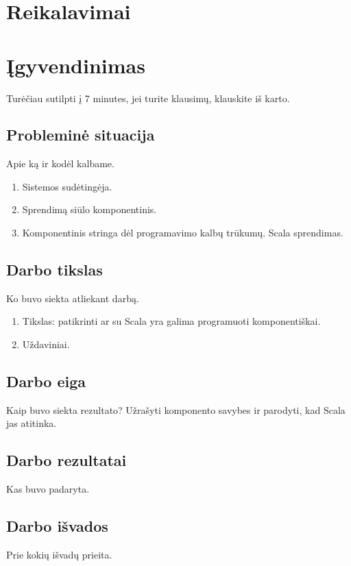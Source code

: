 \section{Reikalavimai}

\section{Įgyvendinimas}

Turėčiau sutilpti į 7 minutes, jei turite klausimų, klauskite iš karto.

\subsection{Probleminė situacija}

Apie ką ir kodėl kalbame.

\begin{enumerate}
  \item Sistemos sudėtingėja.
  \item Sprendimą siūlo komponentinis.
  \item Komponentinis stringa dėl programavimo kalbų trūkumų. Scala
    sprendimas.
\end{enumerate}

\subsection{Darbo tikslas}

Ko buvo siekta atliekant darbą.

\begin{enumerate}
  \item Tikslas: patikrinti ar su Scala yra galima programuoti
    komponentiškai.
  \item Uždaviniai.
\end{enumerate}

\subsection{Darbo eiga}

Kaip buvo siekta rezultato? Užrašyti komponento savybes ir parodyti,
kad Scala jas atitinka.

\subsection{Darbo rezultatai}

Kas buvo padaryta.

\subsection{Darbo išvados}

Prie kokių išvadų prieita.
